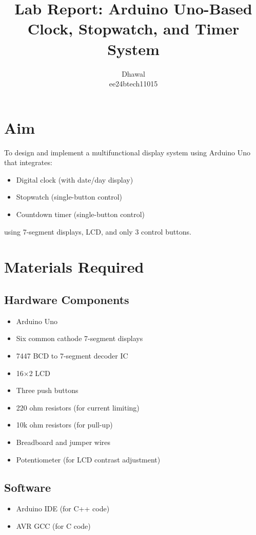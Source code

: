 \documentclass{article}
\title{Lab Report: Arduino Uno-Based Clock, Stopwatch, and Timer System}
\author{Dhawal \\ ee24btech11015}
\begin{document}
\maketitle

\section{Aim}
To design and implement a multifunctional display system using Arduino Uno that integrates:
\begin{itemize}
    \item Digital clock (with date/day display)
    \item Stopwatch (single-button control)
    \item Countdown timer (single-button control)
\end{itemize}
using 7-segment displays, LCD, and only 3 control buttons.

\section{Materials Required}
\subsection{Hardware Components}
\begin{itemize}
    \item Arduino Uno
    \item Six common cathode 7-segment displays
    \item 7447 BCD to 7-segment decoder IC
    \item 16×2 LCD
    \item Three push buttons
    \item 220 ohm resistors (for current limiting)
    \item 10k ohm resistors (for pull-up)
    \item Breadboard and jumper wires
    \item Potentiometer (for LCD contrast adjustment)
\end{itemize}

\subsection{Software}
\begin{itemize}
    \item Arduino IDE (for C++ code)
    \item AVR GCC (for C code)
\end{itemize}
\end{document}
